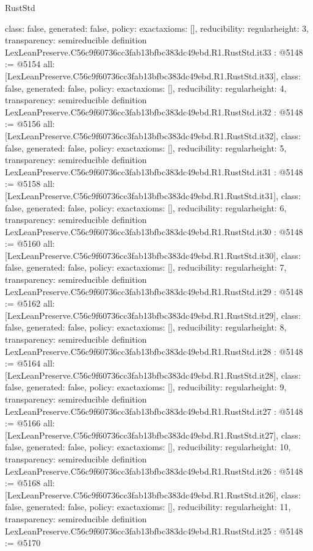 \begin{lexlean}{RustStd}
\begin{coremodule}
{  class: false,
  generated: false,
  policy: exact{axioms: []},
  reducibility: regular{height: 3},
  transparency: semireducible
}
definition LexLeanPreserve.C56c9f60736cc3fab13bfbc383dc49ebd.R1.RustStd.it33 : @5148 := @5154 {
  all: [LexLeanPreserve.C56c9f60736cc3fab13bfbc383dc49ebd.R1.RustStd.it33],
  class: false,
  generated: false,
  policy: exact{axioms: []},
  reducibility: regular{height: 4},
  transparency: semireducible
}
definition LexLeanPreserve.C56c9f60736cc3fab13bfbc383dc49ebd.R1.RustStd.it32 : @5148 := @5156 {
  all: [LexLeanPreserve.C56c9f60736cc3fab13bfbc383dc49ebd.R1.RustStd.it32],
  class: false,
  generated: false,
  policy: exact{axioms: []},
  reducibility: regular{height: 5},
  transparency: semireducible
}
definition LexLeanPreserve.C56c9f60736cc3fab13bfbc383dc49ebd.R1.RustStd.it31 : @5148 := @5158 {
  all: [LexLeanPreserve.C56c9f60736cc3fab13bfbc383dc49ebd.R1.RustStd.it31],
  class: false,
  generated: false,
  policy: exact{axioms: []},
  reducibility: regular{height: 6},
  transparency: semireducible
}
definition LexLeanPreserve.C56c9f60736cc3fab13bfbc383dc49ebd.R1.RustStd.it30 : @5148 := @5160 {
  all: [LexLeanPreserve.C56c9f60736cc3fab13bfbc383dc49ebd.R1.RustStd.it30],
  class: false,
  generated: false,
  policy: exact{axioms: []},
  reducibility: regular{height: 7},
  transparency: semireducible
}
definition LexLeanPreserve.C56c9f60736cc3fab13bfbc383dc49ebd.R1.RustStd.it29 : @5148 := @5162 {
  all: [LexLeanPreserve.C56c9f60736cc3fab13bfbc383dc49ebd.R1.RustStd.it29],
  class: false,
  generated: false,
  policy: exact{axioms: []},
  reducibility: regular{height: 8},
  transparency: semireducible
}
definition LexLeanPreserve.C56c9f60736cc3fab13bfbc383dc49ebd.R1.RustStd.it28 : @5148 := @5164 {
  all: [LexLeanPreserve.C56c9f60736cc3fab13bfbc383dc49ebd.R1.RustStd.it28],
  class: false,
  generated: false,
  policy: exact{axioms: []},
  reducibility: regular{height: 9},
  transparency: semireducible
}
definition LexLeanPreserve.C56c9f60736cc3fab13bfbc383dc49ebd.R1.RustStd.it27 : @5148 := @5166 {
  all: [LexLeanPreserve.C56c9f60736cc3fab13bfbc383dc49ebd.R1.RustStd.it27],
  class: false,
  generated: false,
  policy: exact{axioms: []},
  reducibility: regular{height: 10},
  transparency: semireducible
}
definition LexLeanPreserve.C56c9f60736cc3fab13bfbc383dc49ebd.R1.RustStd.it26 : @5148 := @5168 {
  all: [LexLeanPreserve.C56c9f60736cc3fab13bfbc383dc49ebd.R1.RustStd.it26],
  class: false,
  generated: false,
  policy: exact{axioms: []},
  reducibility: regular{height: 11},
  transparency: semireducible
}
definition LexLeanPreserve.C56c9f60736cc3fab13bfbc383dc49ebd.R1.RustStd.it25 : @5148 := @5170 {
}
\end{coremodule}
\end{lexlean}
